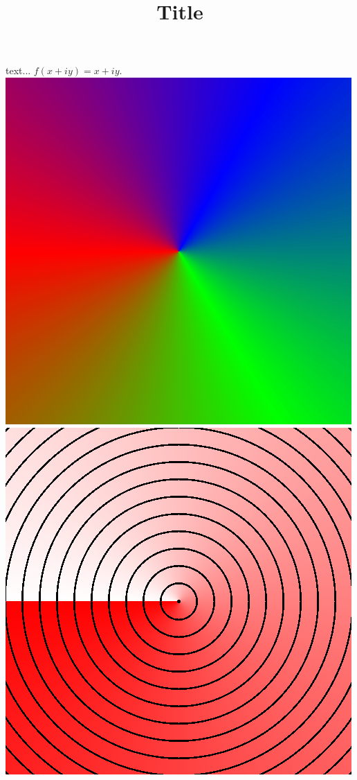 \documentclass{article}
\title{Title}
\author{}
\date{}
\begin{document}
  \maketitle
  \section{}
  text... $f(x+iy) = x+iy$.
  \includegraphics{example1.gif}
  \includegraphics{example2.gif}
\end{document}

